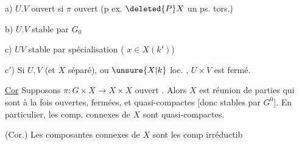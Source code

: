 a) $U.V$ ouvert si $\pi$ ouvert (p ex. $\deleted{P}X$ un ps. tors.)

b) $U.V$ stable par $G_0$ 

c) $UV$ stable par spécialisation  (   $x\in X(k')$) 

c$'$) Si $U,V$  (et $X$  séparé), ou $\unsure{X|k}$ loc. , $U\times V$ est fermé.

\uline{Cor} Supposons  $\pi:G\times X\longrightarrow X\times X$ ouvert . Alors $X$ est réunion de parties   qui sont à la fois ouvertes, fermées, et quasi-compactes [donc stables par $G^0$]. En particulier, les comp. connexes de $X$ sont quasi-compactes.

(Cor.) Les composantes connexes de $X$ sont les comp irréductib

